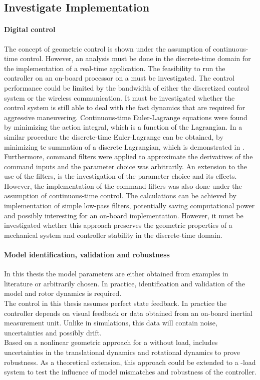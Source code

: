 \subsection{Investigate Implementation}
\paragraph{Digital control} 
The concept of geometric control is shown under the assumption of continuous-time control. 
However, an analysis must be done in the discrete-time domain for the implementation of a real-time application. 
The feasibility to run the controller on an on-board processor on a  must be investigated. 
The control performance could be limited by the bandwidth of either the discretized control system or the wireless communication.
It must be investigated whether the control system is still able to deal with the fast dynamics that are required for aggressive maneuvering. 
Continuous-time Euler-Lagrange equations were found by minimizing the action integral, which is a function of the Lagrangian. 
In a similar procedure the discrete-time Euler-Lagrange can be obtained, by minimizing te summation of a discrete Lagrangian, which is demonstrated in \cite{Lee2008}.\\
Furthermore, command filters were applied to approximate the derivatives of the command inputs and the parameter choice was arbitrarily. 
An extension to the use of the filters, is the investigation of the parameter choice and its effects.
However, the implementation of the command filters was also done under the assumption of continuous-time control. 
The calculations can be achieved by implementation of simple low-pass filters, potentially saving computational power and possibly interesting for an on-board implementation. However, it must be investigated whether this approach preserves the geometric properties of a mechanical system and controller stability in the discrete-time domain.
\paragraph{Model identification, validation and robustness}
In this thesis the model parameters are either obtained from examples in literature or arbitrarily chosen. 
In practice, identification and validation of the  model and rotor dynamics is required.\\
The control in this thesis assumes perfect state feedback. In practice the controller depends on visual feedback or data obtained from an on-board inertial measurement unit. Unlike in simulations, this data will contain noise, uncertainties and possibly drift. \\
Based on a nonlinear geometric approach for a  without load, \cite{Goodarzi2013a} includes uncertainties in the translational dynamics and rotational dynamics to prove robustness. As a theoretical extension, this approach could be extended to a -load system to test the influence of model mismatches and robustness of the controller. 
